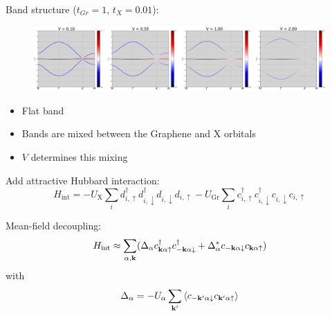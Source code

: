 \documentclass[aspectratio=169]{beamer}
\begin{document}
\begin{frame}
	Band structure (\(t_{Gr} = 1\), \(t_{X} = 0.01\)):
	
	\begin{figure}
		\includegraphics[width=\textwidth]{figs/EG_X bands_tGr_1_tX_0.01}
	\end{figure}
	
	\begin{itemize}
		\item Flat band
		\item Bands are mixed between the Graphene and X orbitals
		\item \(V\) determines this mixing
	\end{itemize}
\end{frame}


\begin{frame}
	Add attractive Hubbard interaction:
	\begin{equation}
		H_{\mathrm{int}} = -U_{\mathrm{X}} \sum_{i} d_{i, \uparrow}^{\dagger} d_{i, \downarrow}^{\dagger} d_{i, \downarrow} d_{i, \uparrow}
		- U_{\mathrm{Gr}} \sum_{i} c_{i, \uparrow}^{\dagger} c_{i, \downarrow}^{\dagger} c_{i, \downarrow} c_{i, \uparrow}
	\end{equation}

	Mean-field decoupling:
	\begin{align}
		H_{\mathrm{int}} \approx \sum_{\alpha, \mathbf{k}} (\Delta_{\alpha} c_{\mathbf{k} \alpha \uparrow}^{\dagger} c_{-\mathbf{k} \alpha \downarrow}^{\dagger} + \Delta_{\alpha}^* c_{-\mathbf{k} \alpha \downarrow} c_{\mathbf{k} \alpha \uparrow})
	\end{align}
	with
	\begin{equation}
		\Delta_{\alpha} = - U_{\alpha} \sum_{\mathbf{k}^{\prime}} \braket{c_{-\mathbf{k}^{\prime} \alpha \downarrow} c_{\mathbf{k}^{\prime} \alpha \uparrow}}
	\end{equation}
\end{frame}
\end{document}
